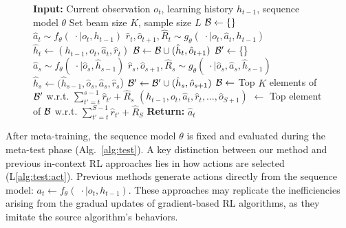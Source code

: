 \documentclass{article}
\begin{document}
\begin{figure*}[t]
\begin{minipage}[t!]{0.49\textwidth}
\begin{algorithm}[H]
            \begin{algorithmic}[1]
            \STATE \textbf{Input:} Current observation $o_t$, learning history $h_{t-1}$, sequence model $\theta$
            \STATE Set beam size $K$, sample size $L$
            \STATE ${\mathcal{B}} \gets \{\}$ 
                \STATE $\hat{a}_t \sim f_\theta(\; \cdot \mid o_t, h_{t-1})$
                \STATE $\hat{r}_t,\hat{o}_{t+1}, \hat{R}_t \sim g_\theta(\; \cdot \mid o_t, \hat{a}_t, h_{t-1})$\label{alg:icp:act1}
                \STATE $\hat{h}_t \gets (h_{t-1}, o_t, \hat{a}_t, \hat{r}_t)$\label{alg:icp:dyn1}
                \STATE ${\mathcal{B}} \gets {\mathcal{B}} \cup (\hat{h}_t,\hat{o}_{t+1})$
            \ENDFOR
            \label{alg:icp:while}
                \STATE ${\mathcal{B}}' \gets \{\}$
                        \STATE $\hat{a}_s \sim f_\theta(\; \cdot \mid \hat{o}_s, \hat{h}_{s-1})$\label{alg:icp:act2}
                        \STATE $\hat{r}_s,\hat{o}_{s+1}, \hat{R}_s \sim g_\theta(\; \cdot \mid \hat{o}_s, \hat{a}_s, \hat{h}_{s-1})$\label{alg:icp:dyn2}
                        \STATE $\hat{h}_s \gets (\hat{h}_{s-1}, \hat{o}_s, \hat{a}_s, \hat{r}_s$)
                        \STATE ${\mathcal{B}}' \gets {\mathcal{B}}' \cup (\hat{h}_s,\hat{o}_{s+1})$
                    \ENDFOR
                \ENDFOR
                \STATE ${\mathcal{B}} \gets$ Top $K$ elements of ${\mathcal{B}}'$ w.r.t. $\sum_{t'=t}^{s-1} \hat{r}_{t'} + \hat{R}_s$\label{alg:icp:topk}
            \ENDWHILE\label{alg:icp:endwhile}
            \STATE $(h_{t-1}, o_t, \hat{a}_t, \hat{r}_t, \dots, \hat{o}_{S+1})$ $\gets$ Top element of ${\mathcal{B}}$ w.r.t. $\sum_{t'=t}^{S-1} \hat{r}_{t'} + \hat{R}_S$\label{alg:icp:top1}
            \STATE \textbf{Return:} $\hat{a}_t$
            \end{algorithmic}
        \end{algorithm}
    \end{minipage}
\end{figure*}

After meta-training, the sequence model $\theta$ is fixed and evaluated during the meta-test phase (Alg.~\ref{alg:test}).
A key distinction between our method and previous in-context RL approaches \citep{AD, DPT, IDT} lies in how actions are selected (L\ref{alg:test:act}).
Previous methods generate actions directly from the sequence model: $a_t \gets f_\theta(\; \cdot \mid o_t, h_{t-1})$.
These approaches may replicate the inefficiencies arising from the gradual updates of gradient-based RL algorithms, as they imitate the source algorithm's behaviors.
\end{document}
